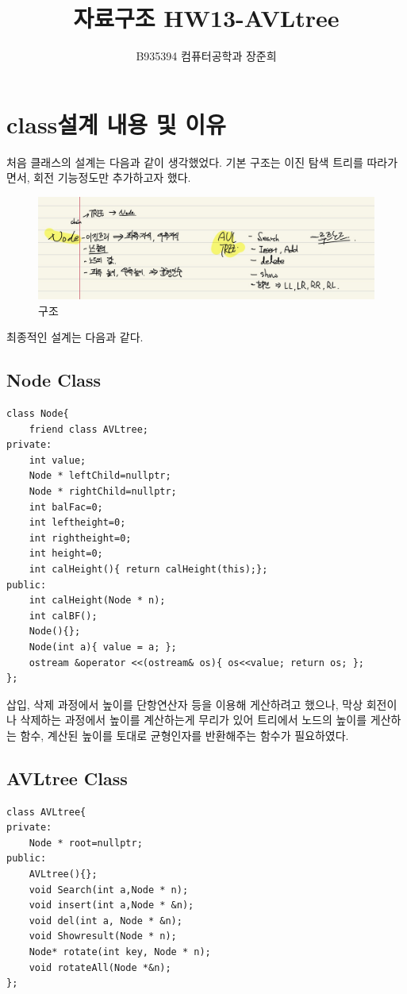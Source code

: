\documentclass[a4paper,11pt]{article}
\begin{document}
\title{자료구조 HW13-AVLtree}
\author{B935394 컴퓨터공학과 장준희}
\maketitle
\newpage
\section{class설계 내용 및 이유}

처음 클래스의 설계는 다음과 같이 생각했었다. 기본 구조는 이진 탐색 트리를 따라가면서, 회전 기능정도만 추가하고자 했다.
\begin{figure}[h]
\begin{center}
\includegraphics[width=\textwidth]{Struct}
\caption{구조}
\label{fig:fig1}
\end{center}
\end{figure}

최종적인 설계는 다음과 같다.
\subsection{Node Class}
\begin{Verbatim}
class Node{
    friend class AVLtree;
private:
    int value;
    Node * leftChild=nullptr;
    Node * rightChild=nullptr;
    int balFac=0;
    int leftheight=0;
    int rightheight=0;
    int height=0;
    int calHeight(){ return calHeight(this);};
public:
    int calHeight(Node * n);
    int calBF();
    Node(){};
    Node(int a){ value = a; };
    ostream &operator <<(ostream& os){ os<<value; return os; };
};
\end{Verbatim}

삽입, 삭제 과정에서 높이를 단항연산자 등을 이용해 게산하려고 했으나, 막상 회전이나 삭제하는 과정에서 높이를 계산하는게 무리가 있어 트리에서 노드의 높이를 게산하는 함수, 계산된 높이를 토대로 균형인자를 반환해주는 함수가 필요하였다.
\subsection{AVLtree Class}
\begin{Verbatim}
class AVLtree{
private:
    Node * root=nullptr;
public:
    AVLtree(){};
    void Search(int a,Node * n);
    void insert(int a,Node * &n);
    void del(int a, Node * &n);
    void Showresult(Node * n);
    Node* rotate(int key, Node * n);
    void rotateAll(Node *&n);
};
\end{Verbatim}
\end{document}
